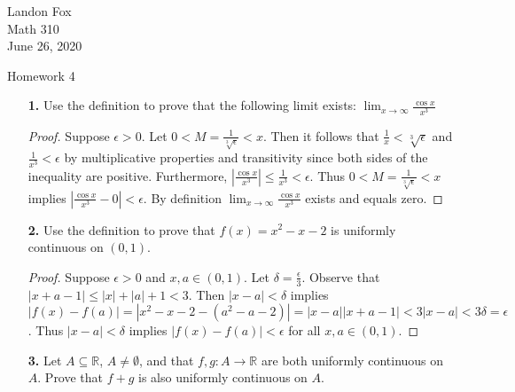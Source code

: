 \documentclass[ 12pt ]{article}
\begin{document}
\noindent Landon Fox \\
\noindent Math 310 \\
\noindent June 26, 2020

\begin{center}
\Large Homework 4
\end{center}

\begin{enumerate}
	\item[\textbf{1.}] Use the definition to prove that the following limit exists: $\lim_{x \rightarrow \infty} \frac{\cos x}{x^3}$

	\begin{proof}
		Suppose $\epsilon > 0$. Let $0 < M = \frac{1}{\sqrt[3]{\epsilon}} < x$. Then it follows that $\frac{1}{x} < \sqrt[3]{\epsilon}$ and $\frac{1}{x^3} <
		\epsilon$ by multiplicative properties and transitivity since both sides of the inequality are positive. Furthermore, $\left | \frac{\cos x}{x^3} \right | \leq
		\frac{1}{x^3} < \epsilon$. Thus $0 < M = \frac{1}{\sqrt[3]{\epsilon}} < x$ implies $\left | \frac{\cos x}{x^3} - 0 \right | < \epsilon$. By definition
		$\lim_{x \rightarrow \infty} \frac{\cos x}{x^3}$ exists and equals zero.
	\end{proof}


	\item[\textbf{2.}] Use the definition to prove that $f(x) = x^2 - x - 2$ is uniformly continuous on $(0,1)$.

	\begin{proof}
		Suppose $\epsilon > 0$ and $x, a \in (0,1)$. Let $\delta = \frac{\epsilon}{3}$. Observe that $|x + a - 1| \leq |x| + |a| + 1 < 3$. Then $|x - a| < \delta$ implies
		$|f(x) - f(a)| = |x^2 - x - 2 - (a^2 - a - 2)| = |x - a||x + a - 1| < 3|x - a| < 3\delta = \epsilon$. Thus $|x - a| < \delta$ implies $|f(x) - f(a)| < \epsilon$ for
		all $x, a \in (0,1)$.
	\end{proof}


	\item[\textbf{3.}] Let $A \subseteq \mathbb{R}$, $A \neq \emptyset$, and that $f,g: A \rightarrow \mathbb{R}$ are both uniformly continuous on $A$. Prove that $f + g$ is
		also uniformly continuous on $A$.


\end{enumerate}
\end{document}
